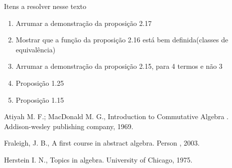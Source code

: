 \documentclass[10pt,a4paper]{article}
\begin{document}
Itens a resolver nesse texto

\begin{enumerate}
	\item Arrumar a demonstração da proposição 2.17
	\item Mostrar que a função da proposição 2.16 está bem definida(classes de equivalência)
	\item Arrumar a demonstração da proposição 2.15, para 4 termos e não 3
	\item Proposição 1.25
	\item Proposição 1.15
\end{enumerate}




\newpage

\begin{thebibliography}{20}
	
	  Atiyah M. F.; MacDonald M. G., Introduction to Commutative Algebra . Addison-wesley publishing company, 1969.
	
	  Fraleigh, J. B., A first course in abstract algebra. Person , 2003.
	
	 Herstein I. N., Topics in algebra. University of Chicago, 1975.	
	
\end{thebibliography}
\end{document}
